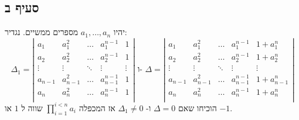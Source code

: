 \documentclass{article}
\begin{document}
	\subsection*{סעיף ב}
	יהיו $a_1, \dots, a_n$ מספרים ממשיים. נגדיר:
	\[
	\Delta_1 = \left| \begin{array}{ccccc}
		a_1 & a_1^2 & \dots & a_1^{n-1} & 1 \\
		a_2 & a_2^2 & \dots & a_2^{n-1} & 1 \\
		\vdots & \vdots & \ddots & \vdots & \vdots \\
		a_{n-1} & a_{n-1}^2 & \dots & a_{n-1}^{n-1} & 1 \\
		a_n & a_n^2 & \dots & a_n^{n-1} & 1 \\
	\end{array}	\right|
	\text{ ו- }
	\Delta = \left| \begin{array}{ccccc}
		a_1 & a_1^2 & \dots & a_1^{n-1} & 1 + a_1^n \\
		a_2 & a_2^2 & \dots & a_2^{n-1} & 1 +  a_2^n \\
		\vdots & \vdots & \ddots & \vdots & \vdots \\
		a_{n-1} & a_{n-1}^2 & \dots & a_{n-1}^{n-1} & 1 + a_{n-1}^n \\
		a_n & a_n^2 & \dots & a_n^{n-1} & 1 + a_n^n \\
	\end{array}	\right|
	\]
	הוכיחו שאם $\Delta = 0$ ו- $\Delta_1 \neq 0$ אז המכפלה $\prod_{i=1}^{i<n}a_i$ שווה ל $1$ או $-1$.
\end{document}
